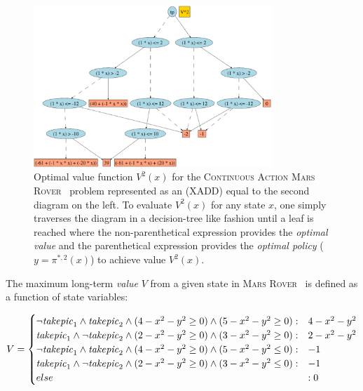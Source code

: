 \documentclass[twoside,11pt]{article}
\newcommand{\MarsRover}{\textsc{Mars Rover }}
\begin{document}
\begin{figure}[t!]
\centering
\includegraphics[width=0.8\textwidth]{pics/roverdot.pdf}
\vspace{6mm}

\caption{Optimal value function $V^2(x)$ for the
\textsc{Continuous Action}  \MarsRover\ problem represented as an (XADD) equal to the second diagram on the left. 
To evaluate
$V^2(x)$ for any state $x$, one simply traverses the diagram in a
decision-tree like fashion until a leaf is reached where the
non-parenthetical expression provides the \emph{optimal value} and the
parenthetical expression provides the \emph{optimal policy} 
($y = \pi^{*,2}(x)$) to achieve value $V^2(x)$.}
\label{fig:opt_val_pol}
\vspace{-5mm}
\end{figure}
The maximum long-term \emph{value} $V$ from a given state in \MarsRover\ 
is defined as a function of state variables:
{\footnotesize


\begin{align*}
V = \begin{cases}
\neg \mathit{take\-pic}_1 \land \mathit{take\-pic}_2 \land (4 -x^2 -y^2\geq 0) \land 
(5 - x^2 - y^2\geq 0) : & 4 -x^2 -y^2 \\
\mathit{take\-pic}_1 \land \neg \mathit{take\-pic}_2 \land (2 -x^2 -y^2\geq 0) \land 
(3 - x^2 - y^2\geq 0) : & 2 -x^2 -y^2 \\
\neg \mathit{take\-pic}_1 \land \mathit{take\-pic}_2 \land (4 -x^2 -y^2\geq 0) \land 
(5 - x^2 - y^2\leq 0) : & -1 \\
\mathit{take\-pic}_1 \land \neg \mathit{take\-pic}_2 \land (2 -x^2 -y^2\geq 0) \land 
(3 - x^2 - y^2\leq 0) : & -1 \\
else &: 0 \\
\end{cases} 
\end{align*}
}
\end{document}
